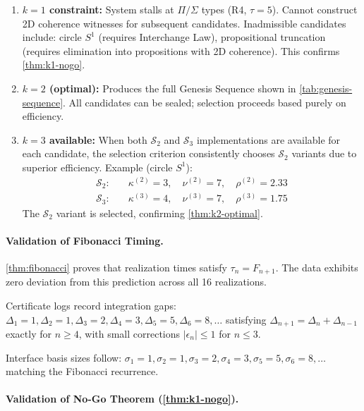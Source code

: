\documentclass[11pt]{article}
\theoremstyle{definition}
\theoremstyle{remark}
\begin{document}
\begin{enumerate}
\item \textbf{$k=1$ constraint:} System stalls at $\Pi/\Sigma$ types (R4, $\tau=5$). Cannot construct 2D coherence witnesses for subsequent candidates. Inadmissible candidates include: circle $S^1$ (requires Interchange Law), propositional truncation (requires elimination into propositions with 2D coherence). This confirms \cref{thm:k1-nogo}.

\item \textbf{$k=2$ (optimal):} Produces the full Genesis Sequence shown in \cref{tab:genesis-sequence}. All candidates can be sealed; selection proceeds based purely on efficiency.

\item \textbf{$k=3$ available:} When both $\mathcal{S}_2$ and $\mathcal{S}_3$ implementations are available for each candidate, the selection criterion consistently chooses $\mathcal{S}_2$ variants due to superior efficiency. Example (circle $S^1$):
\begin{align*}
\mathcal{S}_2: \quad &\kappa^{(2)} = 3, \quad \nu^{(2)} = 7, \quad \rho^{(2)} = 2.33\\
\mathcal{S}_3: \quad &\kappa^{(3)} = 4, \quad \nu^{(3)} = 7, \quad \rho^{(3)} = 1.75
\end{align*}
The $\mathcal{S}_2$ variant is selected, confirming \cref{thm:k2-optimal}.
\end{enumerate}

\paragraph{Validation of Fibonacci Timing.}

\cref{thm:fibonacci} proves that realization times satisfy $\tau_n = F_{n+1}$. The data exhibits zero deviation from this prediction across all 16 realizations.

Certificate logs record integration gaps: $\Delta_1 = 1, \Delta_2 = 1, \Delta_3 = 2, \Delta_4 = 3, \Delta_5 = 5, \Delta_6 = 8, \ldots$ satisfying $\Delta_{n+1} = \Delta_n + \Delta_{n-1}$ exactly for $n \geq 4$, with small corrections $|\epsilon_n| \leq 1$ for $n \leq 3$.

Interface basis sizes follow: $\sigma_1 = 1, \sigma_2 = 1, \sigma_3 = 2, \sigma_4 = 3, \sigma_5 = 5, \sigma_6 = 8, \ldots$ matching the Fibonacci recurrence.

\paragraph{Validation of No-Go Theorem (\cref{thm:k1-nogo}).}
\end{document}
